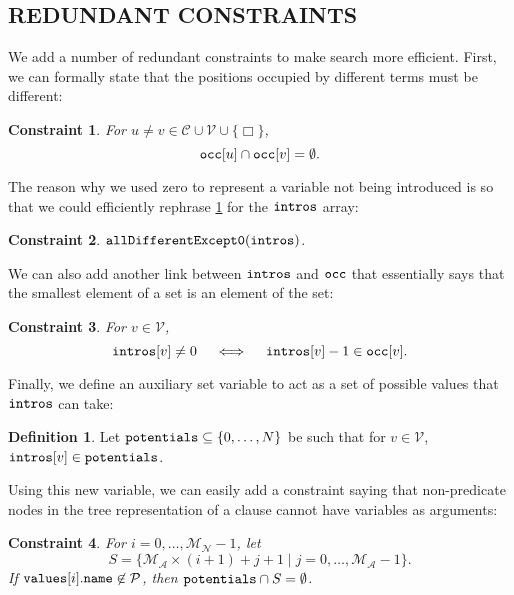\documentclass[letterpaper]{article}
\newtheorem{constraint}{Constraint}
\theoremstyle{definition}
\newtheorem{definition}{Definition}
\newcommand{\variable}[1]{\texttt{\textup{#1}}}
\newcommand{\predicates}{\mathcal{P}}
\newcommand{\variables}{\mathcal{V}}
\newcommand{\constants}{\mathcal{C}}
\newcommand{\maxArity}{\mathcal{M}_{\mathcal{A}}}
\newcommand{\maxNumNodes}{\mathcal{M}_{\mathcal{N}}}
\begin{document}
\subsection{REDUNDANT CONSTRAINTS}

We add a number of redundant constraints to make search more efficient. First,
we can formally state that the positions occupied by different terms must be
different:

\begin{constraint} \label{constraint:all_diff}
  For $u \ne v \in \constants{} \cup \variables{} \cup \{ \Box \}$,
  \[
    \variable{occ}[u] \cap \variable{occ}[v] = \emptyset.
  \]
\end{constraint}

The reason why we used zero to represent a variable not being introduced is so
that we could efficiently rephrase \cref{constraint:all_diff} for the
$\variable{intros}$ array:

\begin{constraint} \label{constraint:diffbutzero}
  $\variable{allDifferentExcept0}(\variable{intros})$.
\end{constraint}

We can also add another link between $\variable{intros}$ and $\variable{occ}$
that essentially says that the smallest element of a set is an element of the
set:

\begin{constraint}
  For $v \in \variables{}$,
  \[
    \variable{intros}[v] \ne 0 \quad \iff \quad
    \variable{intros}[v] - 1 \in \variable{occ}[v].
  \]
\end{constraint}


Finally, we define an auxiliary set variable to act as a set of possible values
that $\variable{intros}$ can take:

\begin{definition}
  Let $\variable{potentials} \subseteq \{ 0, \dots, N \}$ be such that for $v
  \in \variables{}$, $\variable{intros}[v] \in \variable{potentials}$.
\end{definition}

Using this new variable, we can easily add a constraint saying that
non-predicate nodes in the tree representation of a clause cannot have variables
as arguments:

\begin{constraint} \label{constraint:potentialIntroductions}
  For $i = 0, \dots, \maxNumNodes{} - 1$, let
  \[
    S = \{ \maxArity{} \times (i + 1) + j + 1 \mid j = 0, \dots, \maxArity{} - 1
    \}.
  \]
  If $\variable{values}[i].\variable{name} \not\in \predicates{}$, then
  $\variable{potentials} \cap S = \emptyset$.
\end{constraint}
\end{document}

